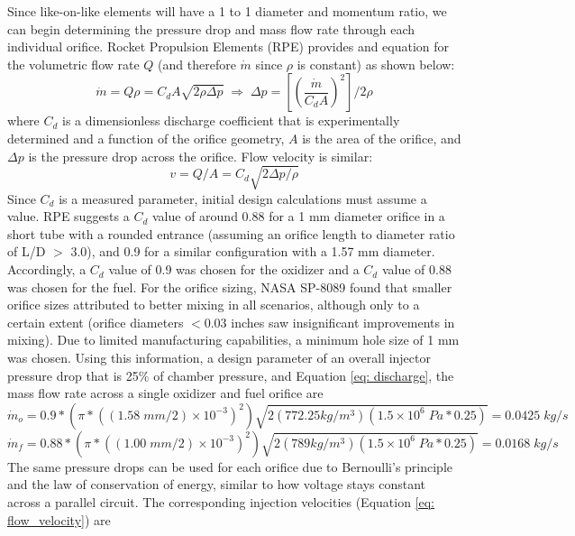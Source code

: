\documentclass[9pt]{article} %
\numberwithin{equation}{section} %
\begin{document}
Since like-on-like elements will have a 1 to 1 diameter and momentum ratio, we can begin determining the pressure drop and mass flow rate through each individual orifice. Rocket Propulsion Elements (RPE) provides and equation for the volumetric flow rate $Q$ (and therefore $\dot{m}$ since $\rho$ is constant) as shown below:
\begin{equation} \label{eq: discharge}
    \dot{m} = Q \rho = C_{d} A \sqrt{2 \rho \Delta p} \; \Longrightarrow \;
    \Delta p = \left[ \left( \frac{\dot{m}}{C_{d} A} \right)^{2} \right] / 2 \rho
\end{equation}
where $C_{d}$ is a dimensionless discharge coefficient that is experimentally determined and a function of the orifice geometry, $A$ is the area of the orifice, and $\Delta p$ is the pressure drop across the orifice. Flow velocity is similar:
\begin{equation} \label{eq: flow_velocity}
    v = Q/A = C_{d} \sqrt{2 \Delta p /\rho}
\end{equation}
Since $C_{d}$ is a measured parameter, initial design calculations must assume a value. RPE suggests a $C_{d}$ value of around 0.88 for a 1 mm diameter orifice in a short tube with a rounded entrance (assuming an orifice length to diameter ratio of L/D $>$ 3.0), and 0.9 for a similar configuration with a 1.57 mm diameter. Accordingly, a $C_{d}$ value of 0.9 was chosen for the oxidizer and a $C_{d}$ value of 0.88 was chosen for the fuel. For the orifice sizing, NASA SP-8089 found that smaller orifice sizes attributed to better mixing in all scenarios, although only to a certain extent (orifice diameters $<$0.03 inches saw insignificant improvements in mixing). Due to limited manufacturing capabilities, a minimum hole size of 1 mm was chosen. Using this information, a design parameter of an overall injector pressure drop that is 25$\%$ of chamber pressure, and Equation \ref{eq: discharge}, the mass flow rate across a single oxidizer and fuel orifice are
\begin{equation*}
    \dot{m}_{o} = 0.9*(\pi*((1.58 \; mm/2)\times 10^{-3})^{2}) \sqrt{2(772.25 kg/m^{3})(1.5 \times 10^{6} \; Pa * 0.25)} = 0.0425 \; kg/s
\end{equation*}
\begin{equation*}
    \dot{m}_{f} = 0.88*(\pi*((1.00 \; mm/2)\times 10^{-3})^{2}) \sqrt{2(789 kg/m^{3})(1.5 \times 10^{6} \; Pa * 0.25)} = 0.0168 \; kg/s
\end{equation*}
The same pressure drops can be used for each orifice due to Bernoulli's principle and the law of conservation of energy, similar to how voltage stays constant across a parallel circuit. The corresponding injection velocities (Equation \ref{eq: flow_velocity}) are
\end{document}

